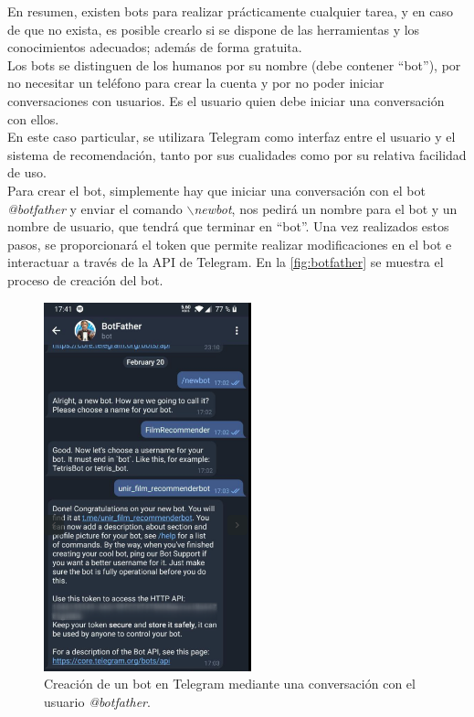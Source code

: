 En resumen, existen bots para realizar prácticamente cualquier tarea, y en caso de que no exista, es posible crearlo si se dispone de las herramientas y los conocimientos adecuados; además de forma gratuita.\\

Los bots se distinguen de los humanos por su nombre (debe contener ``bot''), por no necesitar un teléfono para crear la cuenta y por no poder iniciar conversaciones con usuarios. Es el usuario quien debe iniciar una conversación con ellos.\\

En este caso particular, se utilizara Telegram como interfaz entre el usuario y el sistema de recomendación, tanto por sus cualidades como por su relativa facilidad de uso.\\

Para crear el bot, simplemente hay que iniciar una conversación con el bot \textit{@botfather} y enviar el comando \textit{$\backslash$newbot}, nos pedirá un nombre para el bot y un nombre de usuario, que tendrá que terminar en ``bot''. Una vez realizados estos pasos, se proporcionará el token que permite realizar modificaciones en el bot e interactuar a través de la API de Telegram. En la \autoref{fig:botfather} se muestra el proceso de creación del bot.

\begin{figure}[H]
    \centering
    \captionsetup{width=8cm}
    \includegraphics[width=6cm]{contenido/imagenes/botfather.png}
    \caption{Creación de un bot en Telegram mediante una conversación con el usuario \textit{@botfather}.}
    \label{fig:botfather}
\end{figure}



